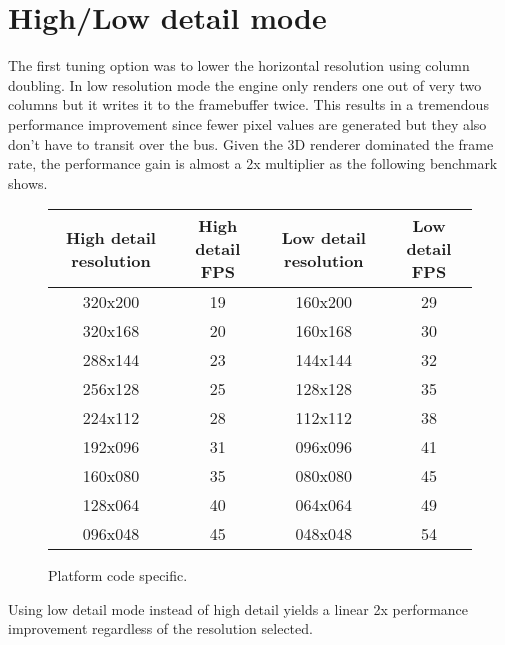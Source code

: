 \section{High/Low detail mode}
The first tuning option was to lower the horizontal resolution using column doubling. In low resolution mode the engine only renders one out of very two columns but it writes it to the framebuffer twice. This results in a tremendous performance improvement since fewer pixel values are generated but they also don't have to transit over the bus. Given the 3D renderer dominated the frame rate, the performance gain is almost a 2x multiplier as the following benchmark shows.\\
\par
 \vspace{0.5cm}
\begin{figure}[H]
\centering  
\begin{tabularx}{\textwidth}{ C{1} C{1} C{1} C{1} } 
  \toprule
  \textbf{High detail resolution} & \textbf{High detail FPS} &  \textbf{Low detail resolution}  & \textbf{Low detail FPS}\\
  \toprule 
320x200  &  19   & 160x200  &       29 \\
320x168  &  20   & 160x168  &       30 \\
288x144  &  23   & 144x144  &       32 \\
256x128  &  25   & 128x128  &       35 \\
224x112  &  28   & 112x112  &       38 \\
192x096  &  31   & 096x096  &       41 \\
160x080  &  35   & 080x080  &       45 \\
128x064  &  40   & 064x064  &       49 \\
096x048  &  45   & 048x048  &       54 \\
  \toprule
\end{tabularx}
\caption{Platform code specific.\protect\footnotemark}
\end{figure}
\par
Using low detail mode instead of high detail yields a linear 2x performance improvement regardless of the resolution selected.


